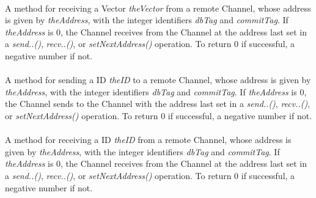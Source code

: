\\
A method for receiving a Vector {\em theVector} from a
remote Channel, whose address is given by {\em theAddress}, with the
integer identifiers {\em dbTag} and {\em commitTag}. If {\em theAddress} 
is $0$, the Channel receives from the Channel at the address last set
in a {\em send..()}, {\em recv..()}, or {\em setNextAddress()}
operation. To return $0$ if successful, a negative number if not. \\ 

\\
A method for sending a ID {\em theID} to a
remote Channel, whose address is given by {\em theAddress}, with the
integer identifiers {\em dbTag} and {\em commitTag}. If {\em theAddress} 
is $0$, the Channel sends to the Channel with the address last set in
a {\em send..()}, {\em recv..()}, or {\em setNextAddress()}
operation. To return $0$ if successful, a negative number if not. \\ 


\\
A method for receiving a ID {\em theID} from a
remote Channel, whose address is given by {\em theAddress}, with the
integer identifiers {\em dbTag} and {\em commitTag}. If {\em theAddress} 
is $0$, the Channel receives from the Channel at the address last set
in a {\em send..()}, {\em recv..()}, or {\em setNextAddress()}
operation. To return $0$ if successful, a negative number if not.


